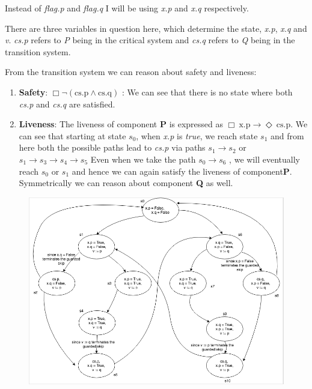\documentclass[18pt]{extarticle}
\begin{document}
Instead of \textsl{flag.p} and \textsl{flag.q} I will be using \textsl{x.p} and \textsl{x.q} respectively. 

There are three variables in question here, which determine the state, \textsl{x.p}, \textsl{x.q} and \textsl{v}. \textsl{cs.p}
 refers to \textsl{P} being in the critical system and \textsl{cs.q} refers to \textsl{Q} being in the transition system. \newline
 
 From the transition system we can reason about safety and liveness\cite{lcs}:
 \begin{enumerate}
 \item \textbf{Safety}: $\Box \neg(\text{cs.p} \land \text{cs.q})$ : We can see that there is no state where both \textsl{cs.p} and \textsl{cs.q} are satisfied.
 \item \textbf{Liveness}: The liveness of component \textbf{P} is expressed as $\Box \ \text{x.p} \rightarrow \Diamond  \ \text{cs.p} $. We can see that starting at state $s_0$, when \textsl{x.p} is \textsl{true}, we reach state $s_1$ and from here both the possible paths lead to \textsl{cs.p} via paths $s_1 \rightarrow s_2$ or $s_1 \rightarrow s_3 \rightarrow s_4 \rightarrow s_5$
Even when we take the path $s_0 \rightarrow s_6$ , we will eventually reach $s_0$ or $s_1$ and hence we can again satisfy the liveness of component\textbf{P}.
Symmetrically we can reason about component \textbf{Q} as well. \newline
 \end{enumerate}
 
\begin{figure}[h]
  \includegraphics[scale=0.6]{tss}
  \label{fig: Transition System}
\end{figure} 
\newpage
\end{document}
